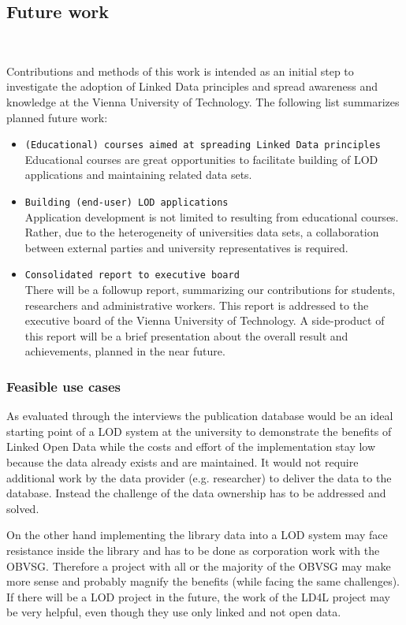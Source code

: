 \subsection{Future work}~\label{subsection:future_work}

Contributions and methods of this work is intended as an initial step to investigate the adoption of Linked Data principles and spread awareness and knowledge at the Vienna University of Technology. The following list summarizes planned future work:

\begin{itemize}
	\item \texttt{(Educational) courses aimed at spreading Linked Data principles}\\
	Educational courses are great opportunities to facilitate building of LOD applications and maintaining related data sets.
	\item \texttt{Building (end-user) LOD applications}\\
	Application development is not limited to resulting from educational courses. Rather, due to the heterogeneity of universities data sets, a collaboration between external parties and university representatives is required.
	\item \texttt{Consolidated report to executive board}\\
	There will be a followup report, summarizing our contributions for students, researchers and administrative workers. This report is addressed to the executive board of the Vienna University of Technology. A side-product of this report will be a brief presentation about the overall result and achievements, planned in the near future.
\end{itemize}

\subsubsection{Feasible use cases}

As evaluated through the interviews the publication database would be an ideal starting point of a LOD system at the university to demonstrate the benefits of Linked Open Data while the costs and effort of the implementation stay low because the data already exists and are maintained. It would not require additional work by the data provider (e.g. researcher) to deliver the data to the database. Instead the challenge of the data ownership has to be addressed and solved.

On the other hand implementing the library data into a LOD system may face resistance inside the library and has to be done as corporation work with the OBVSG. Therefore a project with all or the majority of the OBVSG may make more sense and probably magnify the benefits (while facing the same challenges). If there will be a LOD project in the future, the work of the LD4L project may be very helpful, even though they use only linked and not open data.

